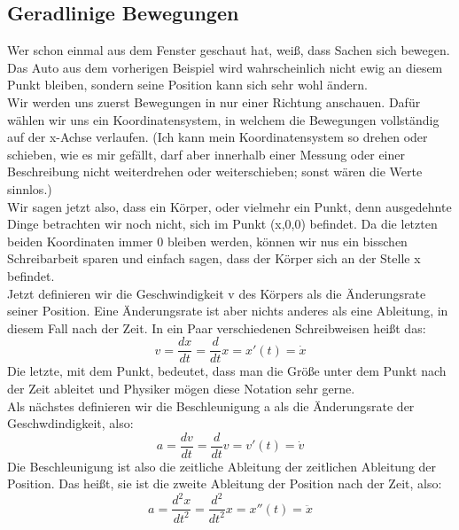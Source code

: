 \documentclass[a4paper, twocolumn, 9pt]{article}
\begin{document}
\begin{footnotesize}
\section*{Geradlinige Bewegungen}
Wer schon einmal aus dem Fenster geschaut hat, weiß, dass Sachen sich bewegen. Das Auto aus dem vorherigen Beispiel wird wahrscheinlich nicht ewig an diesem Punkt bleiben, sondern seine Position kann sich sehr wohl ändern.\\
Wir werden uns zuerst Bewegungen in nur einer Richtung anschauen. Dafür wählen wir uns ein Koordinatensystem, in welchem die Bewegungen vollständig auf der x-Achse verlaufen. (Ich kann mein Koordinatensystem so drehen oder schieben, wie es mir gefällt, darf aber innerhalb einer Messung oder einer Beschreibung nicht weiterdrehen oder weiterschieben; sonst wären die Werte sinnlos.)\\
Wir sagen jetzt also, dass ein Körper, oder vielmehr ein Punkt, denn ausgedehnte Dinge betrachten wir noch nicht, sich im Punkt (x,0,0) befindet. Da die letzten beiden Koordinaten immer 0 bleiben werden, können wir nus ein bisschen Schreibarbeit sparen und einfach sagen, dass der Körper sich an der Stelle x befindet.\\
Jetzt definieren wir die Geschwindigkeit v des Körpers als die Änderungsrate seiner Position. Eine Änderungsrate ist aber nichts anderes als eine Ableitung, in diesem Fall nach der Zeit. In ein Paar verschiedenen Schreibweisen heißt das:
\begin{equation*}
    v= \frac{dx}{dt}=\frac{d}{dt}x=x'(t)=\dot{x}
\end{equation*}
Die letzte, mit dem Punkt, bedeutet, dass man die Größe unter dem Punkt nach der Zeit ableitet und Physiker mögen diese Notation sehr gerne.\\
Als nächstes definieren wir die Beschleunigung a als die Änderungsrate der Geschwdindigkeit, also:
\begin{equation*}
    a = \frac{dv}{dt}=\frac{d}{dt}v=v'(t)=\dot{v}
\end{equation*}
Die Beschleunigung ist also die zeitliche Ableitung der zeitlichen Ableitung der Position. Das heißt, sie ist die zweite Ableitung der Position nach der Zeit, also:
\begin{equation*}
    a = \frac{d^2 x}{dt^2}=\frac{d^2}{dt^2}x=x''(t)=\ddot{x}
\end{equation*}

\end{footnotesize}
\end{document}
